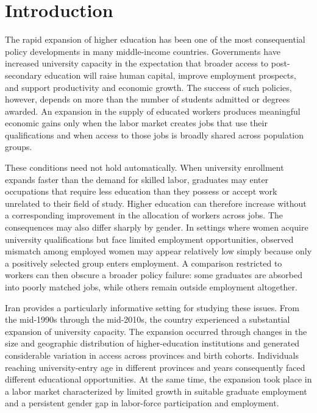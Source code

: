 ﻿%

\section{Introduction}

The rapid expansion of higher education has been one of the most consequential policy developments in many middle-income countries. Governments have increased university capacity in the expectation that broader access to post-secondary education will raise human capital, improve employment prospects, and support productivity and economic growth. The success of such policies, however, depends on more than the number of students admitted or degrees awarded. An expansion in the supply of educated workers produces meaningful economic gains only when the labor market creates jobs that use their qualifications and when access to those jobs is broadly shared across population groups.

These conditions need not hold automatically. When university enrollment expands faster than the demand for skilled labor, graduates may enter occupations that require less education than they possess or accept work unrelated to their field of study. Higher education can therefore increase without a corresponding improvement in the allocation of workers across jobs. The consequences may also differ sharply by gender. In settings where women acquire university qualifications but face limited employment opportunities, observed mismatch among employed women may appear relatively low simply because only a positively selected group enters employment. A comparison restricted to workers can then obscure a broader policy failure: some graduates are absorbed into poorly matched jobs, while others remain outside employment altogether.

Iran provides a particularly informative setting for studying these issues. From the mid-1990s through the mid-2010s, the country experienced a substantial expansion of university capacity. The expansion occurred through changes in the size and geographic distribution of higher-education institutions and generated considerable variation in access across provinces and birth cohorts. Individuals reaching university-entry age in different provinces and years consequently faced different educational opportunities. At the same time, the expansion took place in a labor market characterized by limited growth in suitable graduate employment and a persistent gender gap in labor-force participation and employment.

